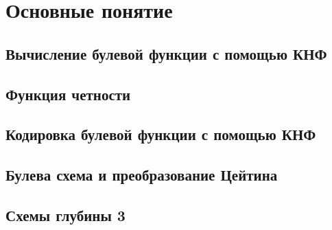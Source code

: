 	\section{Основные понятие}

\subsection{Вычисление булевой функции с помощью КНФ}
\subsection{Функция четности}
\subsection{Кодировка булевой функции с помощью КНФ}
\subsection{Булева схема и преобразование Цейтина}
\subsection{Схемы глубины 3}